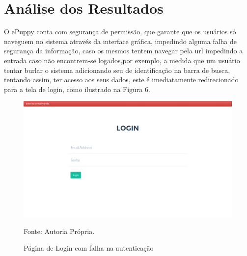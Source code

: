 \section{Análise dos Resultados}

O ePuppy conta com segurança de permissão, que garante que os usuários só naveguem no sistema através da interface gráfica, impedindo alguma falha de segurança da informação, caso os mesmos tentem navegar pela url impedindo a entrada caso não encontrem-se logados,por exemplo, a medida que um usuário tentar burlar o sistema adicionando seu de identificação na barra de busca, tentando assim, ter acesso aos seus dados, este é imediatamente redirecionado para a tela de login, como ilustrado na Figura 6.

\begin{figure}[h!]
	\center	\includegraphics[scale=0.30
	]{imagens/errologin}
	\caption{Página de Login com falha na autenticação}
	Fonte: Autoria Própria.
	\label{Rotulo}
\end{figure}


